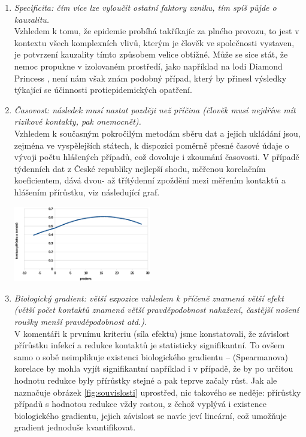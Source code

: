 \begin{enumerate}
\item \emph{Specificita: čím více lze vyloučit ostatní faktory vzniku, tím
spíš půjde o kauzalitu.}\\
Vzhledem k tomu, že epidemie probíhá takříkajíc za plného provozu,
to jest v kontextu všech komplexních vlivů, kterým je člověk ve společnosti
vystaven, je potvrzení kauzality tímto způsobem velice obtížné.
Může se sice stát, že nemoc propukne v izolovaném prostředí, jako
například na lodi Diamond Princess \cite{mizumoto2020transmission},
není nám však znám podobný případ, který by přinesl výsledky týkající
se účinnosti protiepidemických opatření. 
\item \emph{Časovost: následek musí nastat později než příčina (člověk musí
nejdříve mít rizikové kontakty, pak onemocnět).}\\
Vzhledem k současným pokročilým metodám sběru dat a jejich ukládání
jsou, zejména ve vyspělejších státech, k dispozici poměrně přesné
časové údaje o vývoji počtu hlášených případů, což dovoluje i zkoumání časovosti.
V případě týdenních dat z České republiky nejlepší shodu, měřenou
korelačním koeficientem, dává dvou- až třítýdenní zpoždění mezi měřením
kontaktů a hlášením přírůstku, viz následující graf.
\begin{center}
\includegraphics[width=6cm]{pic/lagsel.eps}
\end{center}
\item \emph{Biologický gradient: větší expozice vzhledem k příčeně znamená
větší efekt (větší počet kontaktů znamená větší pravděpodobnost nakažení,
častější nošení roušky menší pravděpodobnost atd.).}\\
V komentáři k prvnímu kriteriu (síla efektu) jsme konstatovali, že závislost přírůstku infekcí a redukce kontaktů je statisticky signifikantní. To ovšem samo o sobě neimplikuje existenci biologického gradientu -- (Spearmanova) korelace by mohla vyjít signifikantní například i v případě, že by po určitou hodnotu redukce byly přírůstky stejné a pak teprve začaly růst. Jak ale naznačuje obrázek \ref{fig:souvislosti} uprostřed, nic takového se neděje: přírůstky případů s hodnotou redukce vždy rostou, z čehož vyplývá i existence
biologického gradientu, jejich závislost se navíc jeví lineární, což umožňuje gradient jednoduše kvantifikovat.

\end{enumerate}
